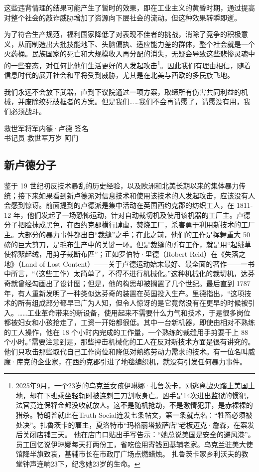 这些违背情理的结果可能产生了暂时的效果，即在工业主义的黄昏时期，通过提高对整个社会的敲诈威胁增加了资源向下层社会的流动。但这种效果转瞬即逝。

为了符合生产规范，福利国家降低了对表现不佳者的挑战，消除了竞争的积极意义，从而制造出大批技能地下、头脑偏执、适应能力差的群体，整个社会就是一个火药桶。民族国家的死亡和大规模收入再分配的消失，无疑会导致这些悲惨灵魂中的一些变态，对任何比他们生活更好的人发起攻击\footnote{2025年9月，一个23岁的乌克兰女孩伊琳娜·扎鲁茨卡，刚逃离战火踏上美国土地，却在下班乘坐轻轨时被连刺三刀割喉身亡。凶手是14次进出监狱的惯犯，法官竟连保释金都没收就放人。这不是随机抢劫，不是激情犯罪，是赤裸裸的猎杀。特朗普就此在Truth Social连发七条帖文，第一条就点名：“牲畜必须被处决”。扎鲁茨卡的雇主，夏洛特市“玛格丽塔披萨店”老板迈克·詹森，在案发后关闭店铺三天。 他在店门口贴出手写告示：“她总说美国是安全的避风港”。 员工回忆说伊琳娜每天打两份工，省吃俭用寄钱回基辅老家。乌克兰驻美大使馆降半旗致哀，基辅市长在市政厅广场点燃蜡烛。 扎鲁茨卡家乡利沃夫的教堂钟声连响23下，纪念她23岁的生命。}。因此我们有理由相信，随着信息时代的展开社会和平将受到威胁，尤其是在北美与西欧的多民族飞地。

\begin{tcolorbox}
\kaishu 我们永远不会放下武器，直到下议院通过一项方案，取缔所有伤害共同利益的机械，并废除绞死破框者的方案。但是我们……我们不会再请愿了，请愿没有用，我们必须战斗。  
\begin{center}
救世军将军内德·卢德 签名 \\
书记员 救世军万岁 阿门
\end{center}
\end{tcolorbox}


\subsection{新卢德分子}
鉴于 19 世纪初反技术暴乱的历史经验，以及欧洲和北美长期以来的集体暴力传统；接下来如果看到新卢德派对信息技术和使用该技术的人发起攻击，应该没有人会感到惊讶。前面提到的卢德派是集中活动在英国西约克郡的纺织工人，在 1811-12 年，他们发起了一场恐怖运动，针对自动裁切机及使用该机器的工厂主。卢德分子把脸抹成黑色，在西约克郡横行肆虐，焚烧工厂，杀害勇于利用新技术的工厂主。大部分的暴力事件都出自“裁缝”之手；在此之前，他们的工作是挥舞重大 50 磅的巨大剪刀，是毛布生产中的关键一环。但是裁缝的所有工作，就是用“起绒草使棉絮起绒，用剪子裁断布匹”；正如罗伯特·里德（Robert Reid）在《失落之地》（Land of Lost Content）——关于卢德运动始末最好、最全面的著作——一书中所言，“（这些工作）太简单了，不得不进行机械化。”这种机械化的裁切机，达芬奇就曾经勾画出了设计图；但是，他的构思却被搁置了几个世纪。最后直到 1787 年，有人重新发明了一种类似达芬奇的装置在英国投入生产。里德指出，“这项技术的所有组成部分都早已广为人知，但令人惊讶的是它竟然没有在更早的时候被引入。……工业革命带来的新设备，使用起来不需要什么力气和技术，于是很多岗位都被妇女和小孩抢走了，工资一开始都很低。其中一台新机器，即使由相对不熟练的工人操作，他在 18 个小时内完成的工作量，一个熟练的裁缝用手剪要干上 88 个小时。”需要注意到是，那些抨击机械化的工人在反对新技术方面是很有讲究的。他们只攻击那些取代自己工作岗位和降低对熟练劳动力需求的技术。有一位名叫威廉·库克的企业家，在西约克郡引进了地毯编织机，就没有引发任何暴力事件。

